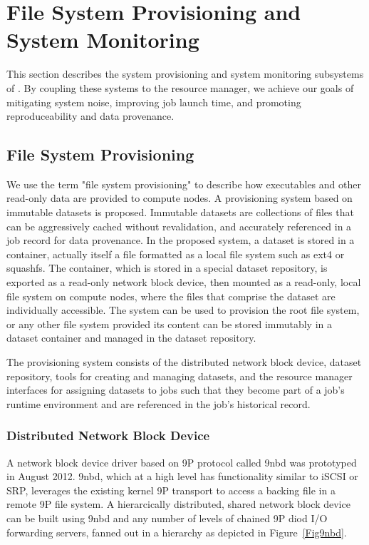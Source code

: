 \section{File System Provisioning and System Monitoring}

This section describes the system provisioning and system monitoring
subsystems of \ngrm.  By coupling these systems to the resource manager,
we achieve our goals of mitigating system noise, improving job launch time,
and promoting reproduceability and data provenance.

\subsection{File System Provisioning}

We use the term "file system provisioning" to describe how executables
and other read-only data are provided to compute nodes.
A provisioning system based on immutable datasets is proposed.
Immutable datasets are collections of files that can be aggressively cached
without revalidation,
and accurately referenced in a job record for data provenance.
In the proposed system, a dataset is stored in a container,
actually itself a file formatted as a local file system such as ext4 or
squashfs.  The container, which is stored in a special dataset repository,
is exported as a read-only network block device,
then mounted as a read-only, local file system on compute nodes,
where the files that comprise the dataset are individually accessible.
The system can be used to provision the root file system,
or any other file system provided its content can be stored immutably
in a dataset container and managed in the dataset repository.

The provisioning system consists of the
distributed network block device,
dataset repository,
tools for creating and managing datasets,
and the resource manager interfaces for assigning datasets to jobs
such that they become part of a job's runtime environment and
are referenced in the job's historical record.


\subsubsection{Distributed Network Block Device}

A network block device driver based on 9P protocol called 9nbd\cite{9nbd}
was prototyped in August 2012.
9nbd, which at a high level has functionality similar to iSCSI or SRP,
leverages the existing kernel 9P transport to access a backing file
in a remote 9P file system.
A hierarcically distributed, shared network block device can be built
using 9nbd and any number of levels of chained 9P diod\cite{diod}
I/O forwarding servers, fanned out in a hierarchy as depicted in
Figure~\ref{Fig9nbd}.

